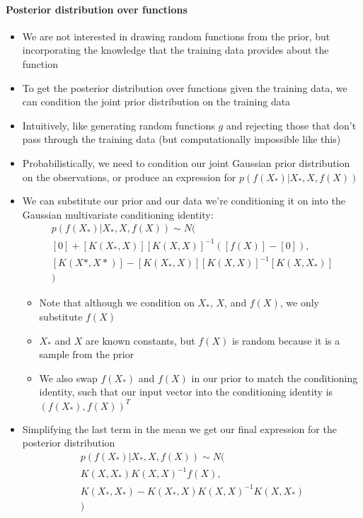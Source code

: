 \documentclass[12pt]{article}
\begin{document}
\paragraph{Posterior distribution over functions}
\begin{itemize}
    \item We are not interested in drawing random functions from the prior, but incorporating the knowledge that the training data provides about the function
    \item To get the posterior distribution over functions given the training data, we can condition the joint prior distribution on the training data
    \item Intuitively, like generating random functions $g$ and rejecting those that don't pass through the training data (but computationally impossible like this)
    \item Probabilistically, we need to condition our joint Gaussian prior distribution on the observations, or produce an expression for $p(f(X_*)|X_*, X, f(X))$
    \item We can substitute our prior and our data we're conditioning it on into the Gaussian multivariate conditioning identity:
\begin{equation}
    \begin{aligned}
        p(f(X_*)|X_*, X, f(X)) \sim N( \\
        [0] + [K(X_*,X)][K(X,X)]^{-1}([f(X)] - [0]), \\
        [K(X*,X*)] - [K(X_*,X)][K(X,X)]^{-1}[K(X,X_*)] \\
        )
    \end{aligned}
\end{equation}
    \begin{itemize}
        \item Note that although we condition on $X_*$, $X$, and $f(X)$, we only substitute $f(X)$
        \item $X_*$ and $X$ are known constants, but $f(X)$ is random because it is a sample from the prior
        \item We also swap $f(X_*)$ and $f(X)$ in our prior to match the conditioning identity, such that our input vector into the conditioning identity is $(f(X_*), f(X))^T$
    \end{itemize}
    \item Simplifying the last term in the mean we get our final expression for the posterior distribution
\begin{equation}
    \begin{aligned}
        p(f(X_*)|X_*, X, f(X)) \sim N( \\
        K(X,X_*)K(X,X)^{-1}f(X), \\
        K(X_*,X_*) - K(X_*,X)K(X,X)^{-1}K(X,X_*) \\
        )
    \end{aligned}
\end{equation}
\end{itemize}
\end{document}
